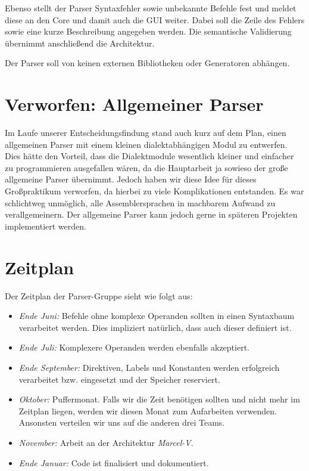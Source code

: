 Ebenso stellt der Parser Syntaxfehler sowie unbekannte Befehle fest und meldet diese an den Core
und damit auch die GUI weiter. Dabei soll die Zeile des Fehlers sowie eine kurze Beschreibung angegeben werden.
Die semantische Validierung übernimmt anschließend die Architektur.

Der Parser soll von keinen externen Bibliotheken oder Generatoren abhängen.

\section{Verworfen: Allgemeiner Parser} Im Laufe unserer Entscheidungsfindung
stand auch kurz auf dem Plan, einen allgemeinen Parser mit einem kleinen
dialektabhängigen Modul zu entwerfen.  Dies hätte den Vorteil, dass die
Dialektmodule wesentlich kleiner und einfacher zu programmieren ausgefallen
wären, da die Hauptarbeit ja sowieso der große allgemeine Parser übernimmt.
Jedoch haben wir diese Idee für dieses Großpraktikum verworfen, da hierbei zu
viele Komplikationen entstanden. Es war schlichtweg unmöglich,
alle Assemblersprachen in machbarem Aufwand zu verallgemeinern.
Der allgemeine Parser kann jedoch gerne in späteren Projekten implementiert werden.

\section{Zeitplan}
Der Zeitplan der Parser-Gruppe sieht wie folgt aus:
\begin{itemize}
\item \emph{Ende Juni:} Befehle ohne komplexe Operanden sollten in einen Syntaxbaum verarbeitet werden. Dies impliziert natürlich, dass auch dieser definiert ist.
\item \emph{Ende Juli:} Komplexere Operanden werden ebenfalls akzeptiert.
\item \emph{Ende September:} Direktiven, Labels und Konstanten werden erfolgreich verarbeitet bzw. eingesetzt und der Speicher reserviert.
\item \emph{Oktober:} Puffermonat. Falls wir die Zeit benötigen sollten und nicht mehr im Zeitplan liegen, werden wir diesen Monat zum Aufarbeiten verwenden. Ansonsten verteilen wir uns auf die anderen drei Teams.
\item \emph{November:} Arbeit an der Architektur \emph{Marcel-V}.
\item \emph{Ende Januar:} Code ist finalisiert und dokumentiert.
\end{itemize}

